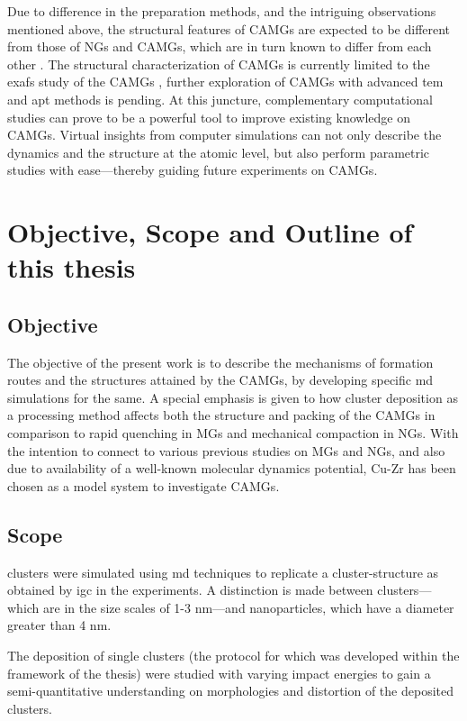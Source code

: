 Due to difference in the preparation methods, and the intriguing observations mentioned above, the structural features of CAMGs are expected to be different from those of NGs and CAMGs, which are in turn known to differ from each other \cite{Adjaoud2018,Ritter2011,Nandam2017,Wang2017}. The structural characterization of CAMGs is currently limited to the \gls{exafs} study of the \fs CAMGs \cite{Benel2019}, further exploration of CAMGs with advanced \gls{tem} and \gls{apt} methods is pending. At this juncture, complementary computational studies can prove to be a powerful tool to improve existing knowledge on CAMGs. Virtual insights from computer simulations can not only describe the dynamics and the structure at the atomic level, but also perform parametric studies with ease---thereby guiding future experiments on CAMGs. \par

\section{Objective, Scope and Outline of this thesis}
\subsection{Objective}

The objective of the present work is to describe the mechanisms of formation routes and the structures attained by the CAMGs, by developing specific \gls{md} simulations for the same. A special emphasis is given to how cluster deposition as a processing method affects both the structure and packing of the CAMGs in comparison to rapid quenching in MGs and mechanical compaction in NGs. With the intention to connect to various previous studies on MGs and NGs, and also due to availability of a well-known molecular dynamics potential, Cu-Zr has been chosen as a model system to investigate CAMGs.  \par

\subsection{Scope}
\cz clusters were simulated using \gls{md} techniques to replicate a cluster-structure as obtained by \gls{igc} in the experiments. A distinction is made between clusters---which are in the size scales of 1-3 nm---and nanoparticles, which have a diameter greater than 4 nm.

The deposition of single \cz clusters (the protocol for which was developed within the framework of the thesis) were studied with varying impact energies to gain a semi-quantitative understanding on morphologies and distortion of the deposited clusters. \par

